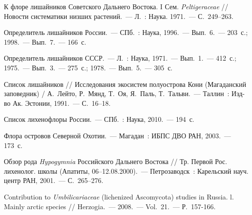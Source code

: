 \begin{thebibliography}{99}
\bibitem{} К флоре лишайников Советского Дальнего Востока. I Сем. \textit{Peltigeraceae} // Новости систематики низших растений.~--- Л.~: Наука. 1971.~--- С.~249--263.

\bibitem{}Определитель лишайников России.~--- СПб.~: Наука, 1996.~--- Вып.~6.~--- 203~с.; 1998.~--- Вып.~7.~--- 166~с.

\bibitem{}Определитель лишайников СССР.~--- Л.~: Наука, 1971.~--- Вып.~1.~--- 412~с.; 1975.~--- Вып.~3.~--- 275~с.; 1978.~--- Вып.~5.~--- 305~с.

\bibitem{} Список лишайников // Исследования экосистем полуострова Кони (Магаданский заповедник) / А.~Лейто, Р.~Мянд, Т.~Оя, Я.~Паль, Т.~Тальви.~--- Таллин~: Изд-во Ак. Эстонии, 1991.~--- С.~16--18.

\bibitem{} Список лихенофлоры России.~--- СПб.~: Наука, 2010.~--- 194~с.

\bibitem{} Флора островов Северной Охотии.~--- Магадан~: ИБПС ДВО РАН, 2003.~--- 173~с.

\bibitem{} Обзор рода \textit{Hypogymnia} Российского Дальнего Востока // Тр. Первой Рос. лихенолог. школы (Апатиты, 06--12.08.2000).~--- Петрозаводск~: Карельский науч. центр РАН, 2001.~--- С.~265--276.

\bibitem{} Contribution to \textit{Umbilicariaceae} (lichenized Ascomycota) studies in Russia. l. Mainly arctic species // Herzogia.~--- 2008.~--- Vol.~21.~--- Р.~157-166.

\end{thebibliography}
\thispagestyle{empty}
